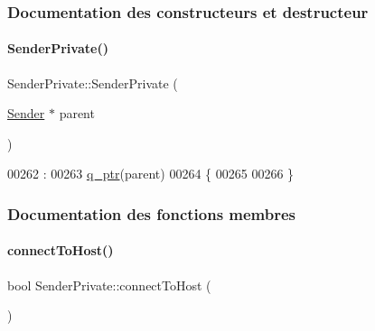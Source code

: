 \subsubsection{Documentation des constructeurs et destructeur}
\mbox{\label{class_simple_mail_1_1_sender_private_a97a8f31b0268f9cab7ee4552e251a2c8}} 
\paragraph{\texorpdfstring{Sender\+Private()}{SenderPrivate()}}
{\footnotesize\ttfamily Sender\+Private\+::\+Sender\+Private (\begin{DoxyParamCaption}\item[{\hyperlink{class_simple_mail_1_1_sender}{Sender} $\ast$}]{parent }\end{DoxyParamCaption})}


\begin{DoxyCode}
00262                                            :
00263     \hyperlink{class_simple_mail_1_1_sender_private_a3cb37d3d22dc1a6a9ddff25708ed1172}{q\_ptr}(parent)
00264 \{
00265 
00266 \}
\end{DoxyCode}


\subsubsection{Documentation des fonctions membres}
\mbox{\label{class_simple_mail_1_1_sender_private_aa2f9a37cfe58c3e39afa75e79070cee1}} 
\paragraph{\texorpdfstring{connect\+To\+Host()}{connectToHost()}}
{\footnotesize\ttfamily bool Sender\+Private\+::connect\+To\+Host (\begin{DoxyParamCaption}{ }\end{DoxyParamCaption})}



